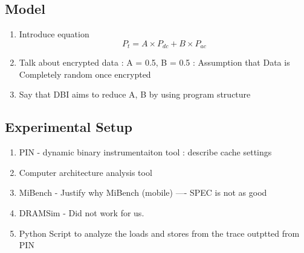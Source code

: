 \subsection{Model}


\begin{enumerate}
  \item Introduce equation
    $$ P_t = A \times P_{dc} + B \times P_{ac}$$
  \item Talk about encrypted data : A = 0.5, B = 0.5 : Assumption that Data is
    Completely random once encrypted
  \item Say that DBI aims to reduce A, B by using program structure
\end{enumerate}

\subsection{Experimental Setup}
\begin{enumerate}
  \item PIN - dynamic binary instrumentaiton tool : describe cache settings
  \item Computer architecture analysis tool
  \item MiBench - Justify why MiBench (mobile) ---- SPEC is not as good
  \item DRAMSim - Did not work for us.
  \item Python Script to analyze the loads and stores from the trace outptted
    from PIN
\end{enumerate}
